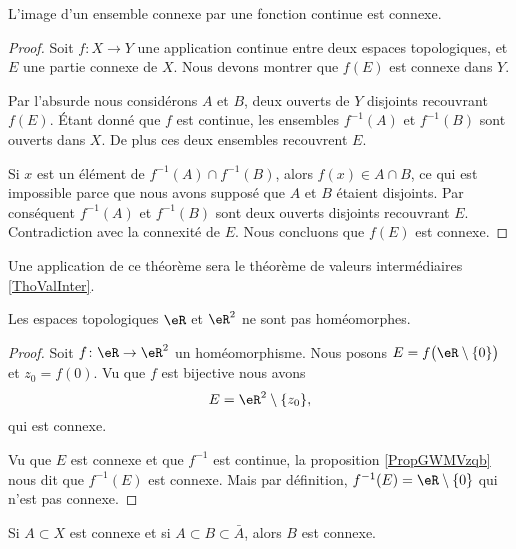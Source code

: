 \begin{proposition}\label{PropGWMVzqb}
    L'image d'un ensemble connexe par une fonction continue est connexe.
\end{proposition}

\begin{proof}
    Soit \( f\colon X\to Y\) une application continue entre deux espaces topologiques, et \( E\) une partie connexe de \( X\). Nous devons montrer que \( f(E)\) est connexe dans \( Y\).

    Par l'absurde nous considérons \( A\) et \( B\), deux ouverts de \( Y\) disjoints recouvrant \( f(E)\). Étant donné que \( f\) est continue, les ensembles \( f^{-1}(A)\) et \( f^{-1}(B)\) sont ouverts dans \( X\). De plus ces deux ensembles recouvrent \( E\).

    Si \( x\) est un élément de \( f^{-1}(A)\cap f^{-1}(B)\), alors \( f(x)\in A\cap B\), ce qui est impossible parce que nous avons supposé que \( A\) et \( B\) étaient disjoints. Par conséquent \( f^{-1}(A)\) et \( f^{-1}(B)\) sont deux ouverts disjoints recouvrant \( E\). Contradiction avec la connexité de \( E\). Nous concluons que \( f(E)\) est connexe.
\end{proof}
Une application de ce théorème sera le théorème de valeurs intermédiaires \ref{ThoValInter}.


\begin{example}
    Les espaces topologiques \( \eR\) et \( \eR^2\) ne sont pas homéomorphes.
\end{example}

\begin{proof}
    Soit \( f\colon \eR\to \eR^2\) un homéomorphisme. Nous posons \( E=f\big( \eR\setminus\{ 0 \} \big)\) et \( z_0=f(0)\). Vu que \( f\) est bijective nous avons
    \begin{equation}
        E=\eR^2\setminus\{ z_0 \},
    \end{equation}
    qui est connexe.

    Vu que \( E\) est connexe et que \( f^{-1}\) est continue, la proposition \ref{PropGWMVzqb} nous dit que \( f^{-1}(E)\) est connexe. Mais par définition, \( f^{-1}(E)=\eR\setminus\{ 0 \}\) qui n'est pas connexe.
\end{proof}


\begin{proposition}
    Si \( A\subset X\) est connexe et si \( A\subset B\subset \bar A\), alors \( B\) est connexe.
\end{proposition}

